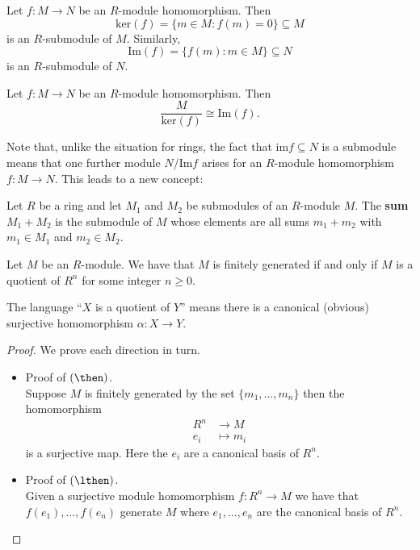 \documentclass[12pt, a4paper]{article}
\begin{document}
\begin{definition}
    Let \( f: M \to N \) be an \( R \)-module homomorphism. Then
    \[\text{ker}(f) = \{ m \in M : f(m) = 0 \} \subseteq M\]
    is an \( R \)-submodule of \( M \). Similarly,
    \[\text{Im}(f) = \{ f(m) : m \in M \} \subseteq N\]
    is an \( R \)-submodule of \( N \).
\end{definition}

\begin{mdthm} 
    Let \( f: M \to N \) be an \( R \)-module homomorphism. Then
    \[\frac{M}{\text{ker}(f)} \cong \text{Im}(f).\]
\end{mdthm}

\noindent Note that, unlike the situation for rings, the fact that \(\text{im} f \subseteq N\) is a submodule means that one further module \(N / \text{Im} f\) arises for an \(R\)-module homomorphism \( f: M \to N \). This leads to a new concept:

\begin{definition}
    Let \( R \) be a ring and let \( M_1 \) and \( M_2 \) be submodules of an \( R \)-module \( M \). The \textbf{sum} \( M_1 + M_2 \) is the submodule of \( M \) whose elements are all sums \( m_1 + m_2 \) with \( m_1 \in M_1 \) and \( m_2 \in M_2 \).
\end{definition}

\begin{mdthm}
    Let \(M\) be an \(R\)-module. We have that \(M\) is finitely generated if and only if \(M\) is a quotient of \(R^n\) for some integer \(n\geq 0\).
\end{mdthm}

\begin{mdnote}
    The language ``\(X\) is a quotient of \(Y\)'' means there is a canonical (obvious) surjective homomorphism \(\alpha : X \to Y\).
\end{mdnote}

\begin{proof}
    We prove each direction in turn.
    \begin{itemize}
        \item Proof of \((\then)\). \\
        Suppose \(M\) is finitely generated by the set \(\{m_1,\ldots,m_n\}\) then the homomorphism
        \[\begin{aligned}
            R^n &\to M \\
            e_i &\mapsto m_i
        \end{aligned}\]
        is a surjective map. Here the \(e_i\) are a canonical basis of \(R^n\).
        \item Proof of \((\lthen)\). \\
        Given a surjective module homomorphism \(f:R^n \to M\)
        we have that \(f(e_1),\ldots,f(e_n)\) generate \(M\) where \(e_1,\ldots,e_n\) are the canonical basis of \(R^n\).
    \end{itemize}
\end{proof}
\end{document}

